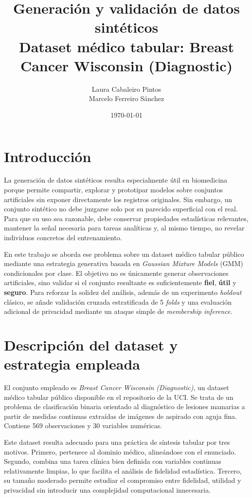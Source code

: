 \documentclass[11pt,a4paper]{article}
\title{\textbf{Generación y validación de datos sintéticos}\\
\large Dataset médico tabular: Breast Cancer Wisconsin (Diagnostic)}
\author{Laura Cabaleiro Pintos \\ Marcelo Ferreiro Sánchez}
\date{\today}
\begin{document}
\maketitle
\thispagestyle{empty}

\section{Introducción}

La generación de datos sintéticos resulta especialmente útil en biomedicina porque permite compartir, explorar y prototipar modelos sobre conjuntos artificiales sin exponer directamente los registros originales. Sin embargo, un conjunto sintético no debe juzgarse solo por su parecido superficial con el real. Para que su uso sea razonable, debe conservar propiedades estadísticas relevantes, mantener la señal necesaria para tareas analíticas y, al mismo tiempo, no revelar individuos concretos del entrenamiento.

En este trabajo se aborda ese problema sobre un dataset médico tabular público mediante una estrategia generativa basada en \textit{Gaussian Mixture Models} (GMM) condicionales por clase. El objetivo no es únicamente generar observaciones artificiales, sino validar si el conjunto resultante es suficientemente \textbf{fiel}, \textbf{útil} y \textbf{seguro}. Para reforzar la solidez del análisis, además de un experimento \textit{holdout} clásico, se añade validación cruzada estratificada de 5 \textit{folds} y una evaluación adicional de privacidad mediante un ataque simple de \textit{membership inference}.

\section{Descripción del dataset y estrategia empleada}

El conjunto empleado es \textit{Breast Cancer Wisconsin (Diagnostic)}, un dataset médico tabular público disponible en el repositorio de la UCI. Se trata de un problema de clasificación binaria orientado al diagnóstico de lesiones mamarias a partir de medidas continuas extraídas de imágenes de aspirado con aguja fina. Contiene 569 observaciones y 30 variables numéricas.

Este dataset resulta adecuado para una práctica de síntesis tabular por tres motivos. Primero, pertenece al dominio médico, alineándose con el enunciado. Segundo, combina una tarea clínica bien definida con variables continuas relativamente limpias, lo que facilita el análisis de fidelidad estadística. Tercero, su tamaño moderado permite estudiar el compromiso entre fidelidad, utilidad y privacidad sin introducir una complejidad computacional innecesaria.
\end{document}
